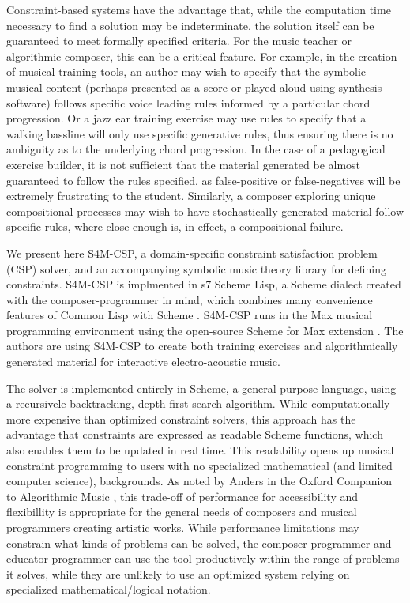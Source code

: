 \documentclass[pmlr]{jmlr}%
\begin{document}
Constraint-based systems have the advantage that, while the computation time necessary
to find a solution may be indeterminate, the solution itself can be guaranteed to meet formally
specified criteria. For the music teacher or algorithmic composer, this can be a critical feature.
For example, in the creation of musical training tools, an author may wish to specify that the 
symbolic musical content (perhaps presented as a score or played aloud using synthesis software)
follows specific voice leading rules informed by a particular chord progression. 
Or a jazz ear training exercise may use rules to specify that a walking bassline will only use
specific generative rules, thus ensuring there is no ambiguity as to the underlying chord progression.
In the case of a pedagogical exercise builder, it is not sufficient that the material generated be almost
guaranteed to follow the rules specified, as false-positive or false-negatives will be extremely frustrating
to the student. Similarly, a composer exploring unique compositional processes may wish to have stochastically
generated material follow specific rules, where close enough is, in effect, a compositional failure.

We present here S4M-CSP, a domain-specific constraint satisfaction problem (CSP) solver, and an 
accompanying symbolic music theory library for defining constraints. 
S4M-CSP is implmented in s7 Scheme Lisp, a Scheme dialect created with the composer-programmer in mind,
which combines many convenience features of Common Lisp with Scheme \citep{s7scheme}. 
S4M-CSP runs in the Max musical programming environment using the 
open-source Scheme for Max extension \citep{Duncan_Scheme_For_Max}. 
The authors are using S4M-CSP to create both training
exercises and algorithmically generated material for interactive electro-acoustic music.

The solver is implemented entirely in Scheme, a
general-purpose language, using a recursivele backtracking,
depth-first search algorithm.  While computationally more expensive
than optimized constraint solvers, this approach has the advantage
that constraints are expressed as readable Scheme functions, which
also enables them to be updated in real time. This readability opens
up musical constraint programming to users with no specialized
mathematical (and limited computer science), backgrounds. As noted by
Anders in the Oxford Companion to Algorithmic Music
\citep{dean2018oxford}, this trade-off of performance for
accessibility and flexibillity is appropriate for the
general needs of composers and musical programmers creating
artistic works. While performance limitations may constrain what kinds
of problems can be solved, the composer-programmer and
educator-programmer can use the tool productively within the range of
problems it solves, while they are unlikely to use an optimized system
relying on specialized mathematical/logical notation. 
\end{document}
